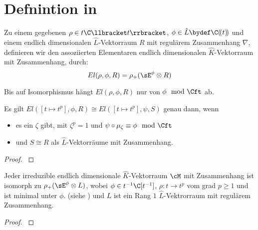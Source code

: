 \section{Defnintion in \cite{sabbah_Fourier-local}}
\begin{defn}
\cite[Def 2.1]{sabbah_Fourier-local}
\begin{comment}
Alternative. ausfürlichere / komplexe definition \cite[Def 5.4.5.]{sabbah_cimpa90}
\end{comment}
Zu einem gegebenen $\rho\in t\C\llbracket t\rrbracket$, $\phi\in \hat L \bydef
\C(\!(t)\!)$ und einem endlich dimensionalen $\hat L$-Vektorraum $R$ mit
regulärem Zusammenhang $\nabla$, definieren wir den assoziierten Elementaren
endlich dimensionalen $\hat K$-Vektorraum mit Zusammenhang, durch:
\[
El(\rho,\phi,R)=\rho_+(\sE^\phi\otimes R)
\]
\end{defn}
\cite[nach Def 2.1]{sabbah_Fourier-local}
Bis auf Isomorphismus hängt $El(\rho,\phi,R)$ nur von $\phi\mod\Cft$ ab.
\begin{lem}
\cite[Lem 2.2]{sabbah_Fourier-local}
\end{lem}
\begin{lem} \cite[Lem 2.6.]{sabbah_Fourier-local}
Es gilt $El([t\mapsto t^p],\phi,R)\cong El([t\mapsto t^p],\psi,S)$ genau dann,
wenn
\begin{itemize}
\item es ein $\zeta$ gibt, mit $\zeta^p=1$ und
$\psi\circ\mu_\zeta\equiv\phi\mod\Cft$
\item und $S\cong R$ als $\hat L$-Vektorräume mit Zusammenhang.
\end{itemize}
\end{lem}
\begin{proof}
\cite[Lem 2.6.]{sabbah_Fourier-local}
\end{proof}
%
\begin{prop} \cite[Prop 3.1]{sabbah_Fourier-local}
Jeder irreduzible endlich dimensionale $\hat K$-Vektorraum $\cM$ mit
Zusammenhang ist isomorph zu $\rho_+(\sE^\phi\otimes L)$, wobei $\phi\in
t^{-1}\C[t^{-1}]$, $\rho:t\rightarrow t^p$ vom grad $p\geq 1$ und ist minimal
unter $\phi$. (siehe \cite[Rem  2.8]{sabbah_Fourier-local}) und $L$ ist ein
Rang $1$ $\hat L$-Vektrorraum mit regulärem Zusammenhang.
\end{prop}
\begin{proof}
\cite[Prop 3.1]{sabbah_Fourier-local}
\end{proof}

